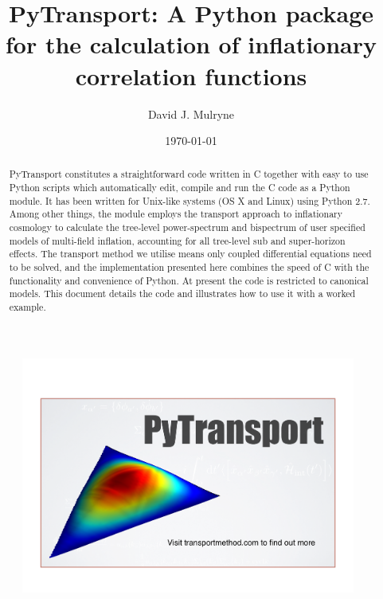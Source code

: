 \documentclass[10pt,
amsmath,amssymb,
aps,prd,nofootinbib,eqsecnum,a4paper]{revtex4}
\newcommand{\CC}{C\nolinebreak\hspace{-.05em}\raisebox{.4ex}{\tiny\bf +}\nolinebreak\hspace{-.10em}\raisebox{.4ex}{\tiny\bf +}}
\def\CC{{C\nolinebreak[4]\hspace{-.05em}\raisebox{.4ex}{\tiny\bf ++}}}
\def\S{ }
\begin{document}
\title{PyTransport: A Python package for the calculation of inflationary correlation functions}
\author{David J. Mulryne}

\date{\today}

\begin{abstract}

\noindent PyTransport constitutes a straightforward code written in \CC \S  together 
with easy to use Python scripts which automatically edit, compile and run the \CC \S code as a 
Python module. It has been written for Unix-like systems (OS X and Linux) using Python 2.7.
Among other things, the module employs the transport approach to inflationary cosmology to calculate 
the tree-level power-spectrum and bispectrum of user specified models of multi-field inflation, 
accounting for all tree-level sub and super-horizon effects.
The transport method we utilise means 
only coupled differential equations need to be solved, and the implementation presented here 
combines the speed of \CC \S  with the functionality and convenience of Python. At present the code 
is restricted to canonical models.
This document details the code and illustrates how to use it with a worked example.


\end{abstract}

\maketitle





\begin{figure}[H]
\centering
\includegraphics[width=11cm]{PyTransLogo}
\end{figure}
\end{document}
